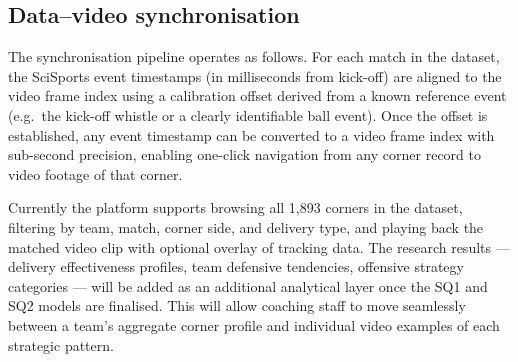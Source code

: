 \subsection{Data--video synchronisation}

The synchronisation pipeline operates as follows. For each match in the
dataset, the SciSports event timestamps (in milliseconds from kick-off)
are aligned to the video frame index using a calibration offset derived
from a known reference event (e.g.\ the kick-off whistle or a clearly
identifiable ball event). Once the offset is established, any event
timestamp can be converted to a video frame index with sub-second
precision, enabling one-click navigation from any corner record to
video footage of that corner.

Currently the platform supports browsing all 1{,}893 corners in the
dataset, filtering by team, match, corner side, and delivery type, and
playing back the matched video clip with optional overlay of tracking
data. The research results — delivery effectiveness profiles, team
defensive tendencies, offensive strategy categories — will be added as
an additional analytical layer once the SQ1 and SQ2 models are
finalised. This will allow coaching staff to move seamlessly between a
team's aggregate corner profile and individual video examples of each
strategic pattern.
